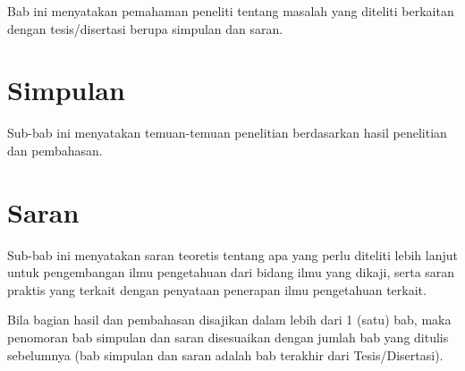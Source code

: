 Bab ini menyatakan pemahaman peneliti tentang masalah yang diteliti berkaitan dengan tesis/disertasi berupa simpulan dan saran.

\section{Simpulan}
Sub-bab ini menyatakan temuan-temuan penelitian berdasarkan hasil penelitian dan pembahasan.

\section{Saran}
Sub-bab ini menyatakan saran teoretis tentang apa yang perlu diteliti lebih lanjut untuk pengembangan ilmu pengetahuan dari bidang ilmu yang dikaji, serta saran praktis yang terkait dengan penyataan penerapan ilmu pengetahuan terkait.

Bila bagian hasil dan pembahasan disajikan dalam lebih dari 1 (satu) bab, maka penomoran bab simpulan dan saran disesuaikan dengan jumlah bab yang ditulis sebelumnya (bab simpulan dan saran adalah bab terakhir dari Tesis/Disertasi).

